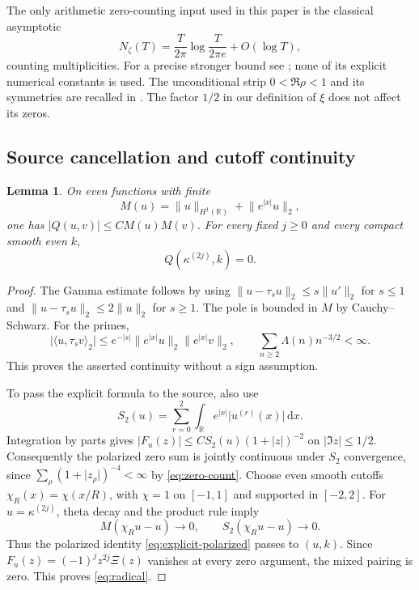 \documentclass[11pt,a4paper]{article}
\newcommand{\R}{\mathbb R}
\newcommand{\ip}[2]{\langle #1,#2\rangle}
\newcommand{\norm}[1]{\lVert #1\rVert}
\newcommand{\abs}[1]{\lvert #1\rvert}
\newcommand{\dd}{\,\mathrm d}
\newtheorem{lemma}[theorem]{Lemma}
\theoremstyle{definition}
\theoremstyle{remark}
\numberwithin{equation}{section}
\begin{document}
The only arithmetic zero-counting input used in this paper is the classical
asymptotic
\begin{equation}\label{eq:zero-count}
 N_\zeta(T)=\frac{T}{2\pi}\log\frac{T}{2\pi e}+O(\log T),
\end{equation}
counting multiplicities. For a precise stronger bound see
\cite[Corollary 1.2]{hsw}; none of its explicit numerical constants is used.
The unconditional strip $0<\Re\rho<1$ and its symmetries are recalled in
\cite[Section~25.10]{dlmf}. The factor $1/2$ in our definition of $\xi$
does not affect its zeros.

\subsection{Source cancellation and cutoff continuity}
\begin{lemma}\label{lem:continuity}
On even functions with finite
\begin{equation}\label{eq:Mnorm}
 M(u)=\norm u_{H^1(\R)}+\norm{e^{\abs{x}}u}_2,
\end{equation}
one has $\abs{Q(u,v)}\le C M(u)M(v)$. For every fixed $j\ge0$ and every
compact smooth even $k$,
\begin{equation}\label{eq:radical}
 Q(\kappa^{(2j)},k)=0.
\end{equation}
\end{lemma}
\begin{proof}
The Gamma estimate follows by using
$\norm{u-\tau_su}_2\le s\norm{u'}_2$ for $s\le1$ and
$\norm{u-\tau_su}_2\le2\norm u_2$ for $s\ge1$.
The pole is bounded in $M$ by Cauchy--Schwarz. For the primes,
\begin{equation}\label{eq:correlation}
 \abs{\ip u{\tau_sv}_2}
 \le e^{-\abs{s}}\norm{e^{\abs{x}}u}_2\norm{e^{\abs{x}}v}_2,
 \qquad \sum_{n\ge2}\Lambda(n)n^{-3/2}<\infty.
\end{equation}
This proves the asserted continuity without a sign assumption.

To pass the explicit formula to the source, also use
\[
 S_2(u)=\sum_{r=0}^2\int_\R e^{\abs{x}}\abs{u^{(r)}(x)}\dd x.
\]
Integration by parts gives
$\abs{F_u(z)}\le C S_2(u)(1+\abs z)^{-2}$ on
$\abs{\Im z}\le1/2$. Consequently the polarized zero sum is jointly
continuous under $S_2$ convergence, since
$\sum_\rho(1+\abs{z_\rho})^{-4}<\infty$ by \eqref{eq:zero-count}.
Choose even smooth cutoffs $\chi_R(x)=\chi(x/R)$, with $\chi=1$ on
$[-1,1]$ and supported in $[-2,2]$. For $u=\kappa^{(2j)}$, theta decay
and the product rule imply
\[
 M(\chi_Ru-u)\longrightarrow0,\qquad
 S_2(\chi_Ru-u)\longrightarrow0.
\]
Thus the polarized identity \eqref{eq:explicit-polarized} passes to $(u,k)$.
Since $F_u(z)=(-1)^jz^{2j}\Xi(z)$ vanishes at every zero argument,
the mixed pairing is zero. This proves \eqref{eq:radical}.
\end{proof}
\end{document}
